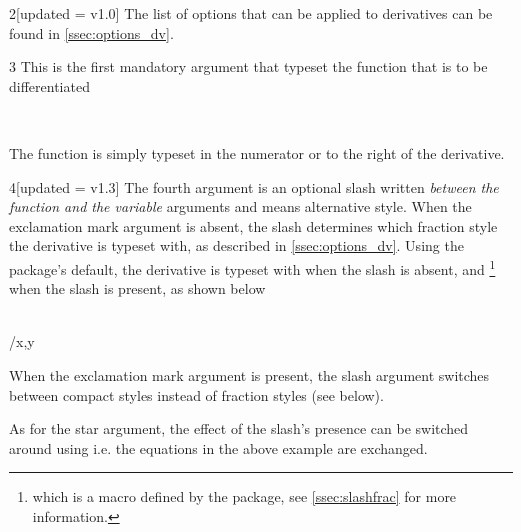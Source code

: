 \begin{function}
\begin{argument}{2}[updated = v1.0]
		\noindent The list of options that can be applied to derivatives can be found in \cref{ssec:options_dv}.
		
	\end{argument}
	
	\begin{argument}{3}
		This is the first mandatory argument that typeset the function that is to be differentiated
		
		\begin{example}
			 \\
		\end{example}
		
		\noindent The function is simply typeset in the numerator or to the right of the derivative.
	\end{argument}
	
	\begin{argument}{4}[updated = v1.3]
		The fourth argument is an optional slash written \emph{between the function and the variable} arguments and means alternative style. When the exclamation mark argument is absent, the slash determines which fraction style the derivative is typeset with, as described in \cref{ssec:options_dv}. Using the package's default, the derivative is typeset with  when the slash is absent, and \footnote{which is a macro defined by the package, see \cref{ssec:slashfrac} for more information.\label{foot:sfrac}} when the slash is present, as shown below
		
		\begin{example}
			\pdv{f}{x,y} \\
			\pdv{f}/{x,y}
		\end{example}
		
		\noindent When the exclamation mark argument is present, the slash argument switches between compact styles instead of fraction styles (see below).
		
		\noindent As for the star argument, the effect of the slash's presence can be switched around using  i.e. the equations in the above example are exchanged.
	\end{argument}
	

\end{function}
